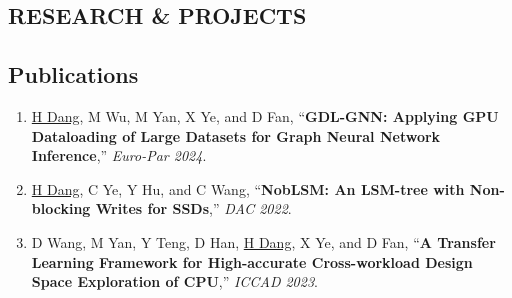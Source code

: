 \documentclass[a4paper,10pt]{ctexart} %
\begin{document}

\begin{keepsection}
\section{RESEARCH \& PROJECTS}

\subsection{Publications}
    \begin{enumerate}
        \item \label{GDL-GNN-Paper} \underline{H Dang}, M Wu, M Yan, X Ye, and D Fan, ``\textbf{GDL-GNN: Applying GPU Dataloading of Large Datasets for Graph Neural Network Inference},'' \textit{Euro-Par 2024}.
        \item \label{NobLSM-Paper} \underline{H Dang}, C Ye, Y Hu, and C Wang, ``\textbf{NobLSM: An LSM-tree with Non-blocking Writes for SSDs},'' \textit{DAC 2022}.
        \item \label{TrEnDSE-Paper} D Wang, M Yan, Y Teng, D Han, \underline{H Dang}, X Ye, and D Fan, ``\textbf{A Transfer Learning Framework for High-accurate Cross-workload Design Space Exploration of CPU},'' \textit{ICCAD 2023}.
    \end{enumerate}
\end{keepsection}
\end{document}
